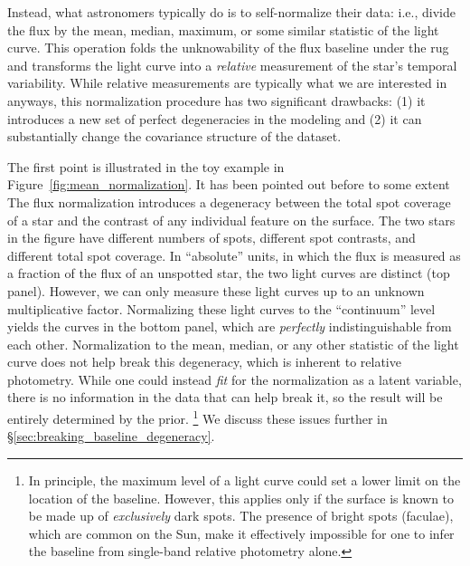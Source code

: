 \documentclass[modern]{aastex62}
\begin{document}
Instead, what astronomers typically do is to self-normalize their data:
i.e., divide the flux by the mean, median, maximum, or some similar
statistic of the light curve. This operation folds the unknowability of
the flux baseline under the rug and transforms the light curve into a \emph{relative}
measurement of the star's temporal variability. While relative measurements
are typically what we are interested in anyways, this normalization procedure
has two significant drawbacks: (1) it introduces a new set of perfect degeneracies
in the modeling and (2) it can substantially change the covariance structure
of the dataset.

The first point is illustrated in the toy example in
Figure~\ref{fig:mean_normalization}.
It has been pointed out before to some extent \citep[e.g.,][]{Basri2018}
The flux normalization introduces a degeneracy between the total spot coverage
of a star and the contrast of any individual feature on the surface.
The two stars in the figure have different numbers of spots, different
spot contrasts, and different total spot coverage. In ``absolute'' units, in which
the flux is measured as a fraction of the flux of an unspotted star, the two
light curves are distinct (top panel). However, we can only measure these light
curves up to an unknown multiplicative factor. Normalizing these light curves
to the ``continuum'' level yields the curves in the bottom panel, which are
\emph{perfectly} indistinguishable from each other. Normalization to the mean,
median, or any other statistic of the light curve does not help break this
degeneracy, which is inherent to relative photometry. While one could instead \emph{fit}
for the normalization as a latent variable, there is no information in the data
that can help break it, so the result will be entirely determined by the prior.%
\footnote{%
    In principle, the maximum level of a light curve could set a lower limit on
    the location of the baseline. However, this applies only if the surface is
    known to be made up of \emph{exclusively} dark spots. The presence of bright
    spots (faculae), which are common on the Sun, make it effectively impossible
    for one to infer the baseline from single-band relative photometry alone.
}
We discuss these issues further in \S\ref{sec:breaking_baseline_degeneracy}.
\end{document}
